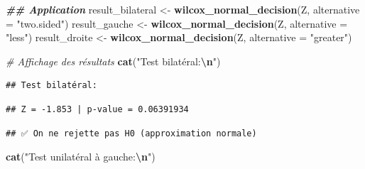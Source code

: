\documentclass[
  12pt,
]{article}
\newenvironment{Shaded}{\begin{snugshade}}{\end{snugshade}}
\newcommand{\AttributeTok}[1]{\textcolor[rgb]{0.13,0.29,0.53}{#1}}
\newcommand{\CommentTok}[1]{\textcolor[rgb]{0.56,0.35,0.01}{\textit{#1}}}
\newcommand{\DecValTok}[1]{\textcolor[rgb]{0.00,0.00,0.81}{#1}}
\newcommand{\DocumentationTok}[1]{\textcolor[rgb]{0.56,0.35,0.01}{\textbf{\textit{#1}}}}
\newcommand{\FunctionTok}[1]{\textcolor[rgb]{0.13,0.29,0.53}{\textbf{#1}}}
\newcommand{\NormalTok}[1]{#1}
\newcommand{\OtherTok}[1]{\textcolor[rgb]{0.56,0.35,0.01}{#1}}
\newcommand{\SpecialCharTok}[1]{\textcolor[rgb]{0.81,0.36,0.00}{\textbf{#1}}}
\newcommand{\StringTok}[1]{\textcolor[rgb]{0.31,0.60,0.02}{#1}}
\begin{document}
\begin{Shaded}
\begin{Highlighting}[]
\DocumentationTok{\#\# Application}
\NormalTok{result\_bilateral }\OtherTok{\textless{}{-}} \FunctionTok{wilcox\_normal\_decision}\NormalTok{(Z, }\AttributeTok{alternative =} \StringTok{"two.sided"}\NormalTok{)}
\NormalTok{result\_gauche }\OtherTok{\textless{}{-}} \FunctionTok{wilcox\_normal\_decision}\NormalTok{(Z, }\AttributeTok{alternative =} \StringTok{"less"}\NormalTok{)}
\NormalTok{result\_droite }\OtherTok{\textless{}{-}} \FunctionTok{wilcox\_normal\_decision}\NormalTok{(Z, }\AttributeTok{alternative =} \StringTok{"greater"}\NormalTok{)}

\CommentTok{\# Affichage des résultats}
\FunctionTok{cat}\NormalTok{(}\StringTok{"Test bilatéral:}\SpecialCharTok{\textbackslash{}n}\StringTok{"}\NormalTok{)}
\end{Highlighting}
\end{Shaded}

\begin{verbatim}
## Test bilatéral:
\end{verbatim}

\begin{Shaded}
\end{Shaded}

\begin{verbatim}
## Z = -1.853 | p-value = 0.06391934
\end{verbatim}

\begin{Shaded}
\end{Shaded}

\begin{verbatim}
## ✅ On ne rejette pas H0 (approximation normale)
\end{verbatim}

\begin{Shaded}
\begin{Highlighting}[]
\FunctionTok{cat}\NormalTok{(}\StringTok{"Test unilatéral à gauche:}\SpecialCharTok{\textbackslash{}n}\StringTok{"}\NormalTok{)}
\end{Highlighting}
\end{Shaded}
\end{document}
